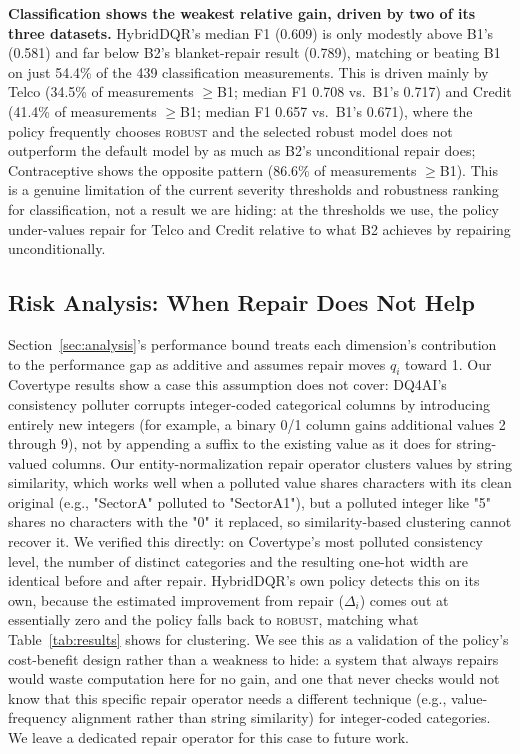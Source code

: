 \documentclass[runningheads]{llncs}
\begin{document}
\textbf{Classification shows the weakest relative gain, driven by
two of its three datasets.} HybridDQR's median F1 (0.609) is only
modestly above B1's (0.581) and far below B2's blanket-repair
result (0.789), matching or beating B1 on just 54.4\% of the 439
classification measurements. This is driven mainly by Telco
(34.5\% of measurements $\geq$B1; median F1 0.708 vs.\ B1's 0.717)
and Credit (41.4\% of measurements $\geq$B1; median F1 0.657 vs.\
B1's 0.671), where the policy frequently chooses \textsc{robust}
and the selected robust model does not outperform the default
model by as much as B2's unconditional repair does; Contraceptive
shows the opposite pattern (86.6\% of measurements $\geq$B1). This
is a genuine limitation of the current severity thresholds and
robustness ranking for classification, not a result we are hiding:
at the thresholds we use, the policy under-values repair for Telco
and Credit relative to what B2 achieves by repairing
unconditionally.

\subsection{Risk Analysis: When Repair Does Not Help}
\label{sec:risk}

Section~\ref{sec:analysis}'s performance bound treats each
dimension's contribution to the performance gap as additive and
assumes repair moves $q_i$ toward 1. Our Covertype results show a
case this assumption does not cover: DQ4AI's consistency polluter
corrupts integer-coded categorical columns by introducing entirely
new integers (for example, a binary 0/1 column gains additional
values 2 through 9), not by appending a suffix to the existing
value as it does for string-valued columns. Our entity-normalization
repair operator clusters values by string similarity, which works
well when a polluted value shares characters with its clean
original (e.g., "SectorA" polluted to "SectorA1"), but a polluted
integer like "5" shares no characters with the "0" it replaced, so
similarity-based clustering cannot recover it. We verified this
directly: on Covertype's most polluted consistency level, the
number of distinct categories and the resulting one-hot width are
identical before and after repair. HybridDQR's own policy detects
this on its own, because the estimated improvement from repair
($\Delta_i$) comes out at essentially zero and the policy falls
back to \textsc{robust}, matching what Table~\ref{tab:results}
shows for clustering. We see this as a validation of the policy's
cost-benefit design rather than a weakness to hide: a system that
always repairs would waste computation here for no gain, and one
that never checks would not know that this specific repair
operator needs a different technique (e.g., value-frequency
alignment rather than string similarity) for integer-coded
categories. We leave a dedicated repair operator for this case to
future work.
\end{document}
